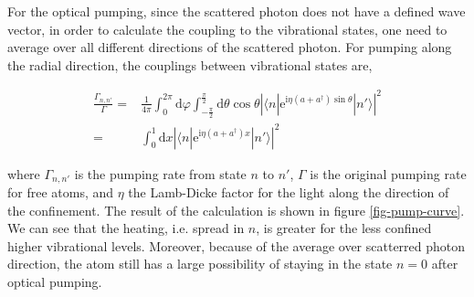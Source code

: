 \documentclass[aps,twocolumn,secnumarabic,balancelastpage,amsmath,amssymb,nofootinbib]{revtex4}
\newcommand{\ud}{\mathrm{d}}
\newcommand{\ue}{\mathrm{e}}
\newcommand{\ui}{\mathrm{i}}
\newcommand{\eqar}[1]
{
  \begin{align*}
    #1
  \end{align*}
}
\newcommand{\paren}[1]{{\left({#1}\right)}}
\newcommand{\abs}[1]{{\left|{#1}\right|}}
\begin{document}
For the optical pumping, since the scattered photon does not have a defined wave vector, in order to calculate the coupling to the vibrational states, one need to average over all different directions of the scattered photon. For pumping along the radial direction, the couplings between vibrational states are,
\eqar{
  \frac{\Gamma_{n,n'}}{\Gamma}=&\frac{1}{4\pi}\int_{0}^{2\pi}\ud\varphi\int_{-\frac\pi2}^{\frac\pi2}\ud\theta\cos\theta\abs{\langle n|\ue^{\ui\eta\paren{a+a^\dagger}\sin\theta}|n'\rangle}^2\\
  =&\int_{0}^{1}\ud x\abs{\langle n|\ue^{\ui\eta\paren{a+a^\dagger}x}|n'\rangle}^2
}
where $\Gamma_{n,n'}$ is the pumping rate from state $n$ to $n'$, $\Gamma$ is the original pumping rate for free atoms, and $\eta$ the Lamb-Dicke factor for the light along the direction of the confinement. The result of the calculation is shown in figure \ref{fig-pump-curve}. We can see that the heating, i.e. spread in $n$, is greater for the less confined higher vibrational levels. Moreover, because of the average over scatterred photon direction, the atom still has a large possibility of staying in the state $n=0$ after optical pumping.
\end{document}

